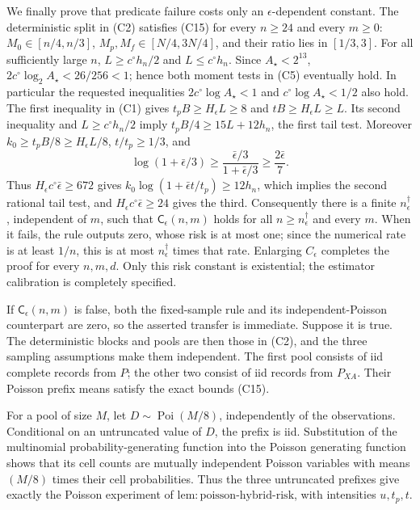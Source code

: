 We finally prove that predicate failure costs only an \(\epsilon\)-dependent constant.  The deterministic split in (C2) satisfies (C15) for every \(n\ge24\) and every \(m\ge0\): \(M_0\in[n/4,n/3]\), \(M_p,M_f\in[N/4,3N/4]\), and their ratio lies in \([1/3,3]\).  For all sufficiently large \(n\), \(L\ge c^\circ h_n/2\) and \(L\le c^\circ h_n\).  Since \(A_\star<2^{13}\), \(2c^\circ\log_2 A_\star<26/256<1\); hence both moment tests in (C5) eventually hold.  In particular the requested inequalities \(2c^\circ\log A_\star<1\) and \(c^\circ\log A_\star<1/2\) also hold.  The first inequality in (C1) gives \(t_pB\ge H_\epsilon L\ge8\) and \(tB\ge H_\epsilon L\ge L\).  Its second inequality and \(L\ge c^\circ h_n/2\) imply \(t_pB/4\ge15L+12h_n\), the first tail test.  Moreover \(k_0\ge t_pB/8\ge H_\epsilon L/8\), \(t/t_p\ge1/3\), and
\[
 \log(1+\bar\epsilon/3)\ge\frac{\bar\epsilon/3}{1+\bar\epsilon/3}\ge\frac{2\bar\epsilon}{7}.
\]
Thus \(H_\epsilon c^\circ\bar\epsilon\ge672\) gives \(k_0\log(1+\bar\epsilon t/t_p)\ge12h_n\), which implies the second rational tail test, and \(H_\epsilon c^\circ\bar\epsilon\ge24\) gives the third.  Consequently there is a finite \(n_\epsilon^\dagger\), independent of \(m\), such that \(\mathsf C_\epsilon(n,m)\) holds for all \(n\ge n_\epsilon^\dagger\) and every \(m\).  When it fails, the rule outputs zero, whose risk is at most one; since the numerical rate is at least \(1/n\), this is at most \(n_\epsilon^\dagger\) times that rate.  Enlarging \(C_\epsilon\) completes the proof for every \(n,m,d\).  Only this risk constant is existential; the estimator calibration is completely specified.

If \(\mathsf C_\epsilon(n,m)\) is false, both the fixed-sample rule and its independent-Poisson counterpart are zero, so the asserted transfer is immediate.  Suppose it is true.  The deterministic blocks and pools are then those in (C2), and the three sampling assumptions make them independent.  The first pool consists of iid complete records from \(P\); the other two consist of iid records from \(P_{XA}\).  Their Poisson prefix means satisfy the exact bounds (C15).

For a pool of size \(M\), let \(D\sim\operatorname{Poi}(M/8)\), independently of the observations.  Conditional on an untruncated value of \(D\), the prefix is iid.  Substitution of the multinomial probability-generating function into the Poisson generating function shows that its cell counts are mutually independent Poisson variables with means \((M/8)\) times their cell probabilities.  Thus the three untruncated prefixes give exactly the Poisson experiment of \(\mathrm{lem:poisson\mbox{-}hybrid\mbox{-}risk}\), with intensities \(u,t_p,t\).

